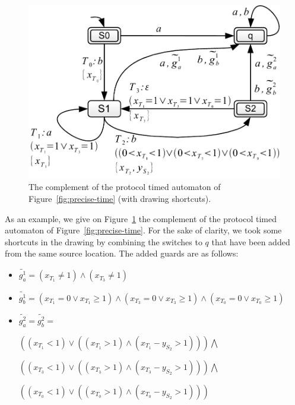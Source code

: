 \begin{figure}[htbp]
  \includegraphics[width=\textwidth]{content/protocol-operators/complement-precise-time}
  \caption{The complement of the protocol timed automaton of Figure~\ref{fig:precise-time} (with drawing shortcuts).}
  \label{fig:complement-precise-time}
\end{figure}

As an example, we give on Figure~\ref{fig:complement-precise-time} the complement of the protocol timed automaton of Figure~\ref{fig:precise-time}. For the sake of clarity, we took some shortcuts in the drawing by combining the switches to $q$ that have been added from the same source location. The added guards are as follows:
\begin{itemize}
  
  \item $\widetilde{g_a^1} = (x_{T_1} \neq 1) \wedge (x_{T_3} \neq 1)$
  
  \item $\widetilde{g_b^1} = (x_{T_1} = 0 \vee x_{T_1} \geq 1) \wedge (x_{T_3} = 0 \vee x_{T_3} \geq 1) \wedge (x_{T_0} = 0 \vee x_{T_0} \geq 1)$
  
  \item $\widetilde{g_a^2} = \widetilde{g_b^2} = $
  
    $\left(
     (x_{T_1} < 1) \vee \left( (x_{T_1} > 1) \wedge (x_{T_1} - y_{S_2} > 1) \right)
    \right)
    \bigwedge$    
    
    $\left(
      (x_{T_3} < 1) \vee \left( (x_{T_3} > 1) \wedge (x_{T_3} - y_{S_2} > 1) \right)
    \right)    
    \bigwedge$
    
    $\left(
      (x_{T_0} < 1) \vee \left( (x_{T_0} > 1) \wedge (x_{T_0} - y_{S_2} > 1) \right)
    \right)$
  
\end{itemize}


